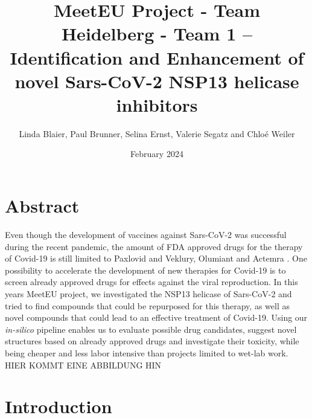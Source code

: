 \documentclass[11pt, letterpaper, titlepage]{article}
\title{MeetEU Project - Team Heidelberg - Team 1 -- \\ Identification and Enhancement of novel Sars-CoV-2 NSP13 helicase inhibitors}
\author{Linda Blaier, Paul Brunner, Selina Ernst, Valerie Segatz and Chlo\'{e} Weiler}
\date{February 2024}
\renewcommand{\cite}{\parencite}
\begin{document}
\maketitle

\ihead{\headmark}
\cfoot{\pagemark}   %

\section{Abstract}
Even though the development of vaccines against Sars-CoV-2 was successful during the recent pandemic, the amount of FDA approved drugs for the therapy of Covid-19 is still limited to Paxlovid and Veklury, Olumiant and Actemra \cite{FDA_COVID}. One possibility to accelerate the development of new therapies for Covid-19 is to screen already approved drugs for effects against the viral reproduction. In this years MeetEU project, we investigated the NSP13 helicase of Sars-CoV-2 and tried to find compounds that could be repurposed for this therapy, as well as novel compounds that could lead to an effective treatment of Covid-19. Using our \textit{in-silico} pipeline enables us to evaluate possible drug candidates, suggest novel structures based on already approved drugs and investigate their toxicity, while being cheaper and less labor intensive than projects limited to wet-lab work. 
HIER KOMMT EINE ABBILDUNG HIN


\FloatBarrier


\section{Introduction}
\end{document}
